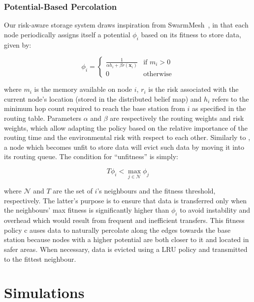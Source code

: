 \subsubsection{Potential-Based Percolation}
Our risk-aware storage system draws inspiration from 
SwarmMesh~\cite{majcherczykSwarmmesh2020}, in that each node periodically assigns
itself a potential $\phi_i$ based on its fitness to store data, given by:

\begin{equation}
        \phi_i =
        \left\{ 
        \begin{array}{ll}
            \frac{1}{\alpha h_i + \beta r({\bm{x}_i})} &\text{if } m_i > 0 \\
            0 &\text{otherwise}
        \end{array} \right.
        \label{equation:fitness}
\end{equation}

 where $m_i$ is the memory available on node $i$, $r_i$ is the risk
 associated with the current node's location (stored in the
 distributed belief map) and $h_i$ refers to the minimum hop count
 required to reach the base station from $i$ as specified in the
 routing table. Parameters $\alpha$ and $\beta$ are respectively the routing weights and 
 risk weights, which allow adapting the policy based on the relative importance of the 
 routing time and the environmental risk with respect to each other. Similarly to 
 \cite{majcherczykSwarmmesh2020}, a node  which becomes unfit to store data will evict such 
 data by moving it into its routing queue. The condition for ``unfitness'' is simply:

\begin{equation}
    T\phi_i < \max_{j \in \mathcal{N}} \phi_j
\end{equation}

where $\mathcal{N}$ and $T$ are the set of $i$'s neighbours and the fitness threshold, 
respectively. The latter's purpose is to ensure that data is transferred only when the 
neighbours' max fitness is significantly higher than $\phi_i$ to avoid instability and 
overhead which would result from frequent and inefficient transfers. This fitness policy  c
auses data to naturally percolate along the edges towards the base station because nodes 
with a higher potential are both closer to it and
located in safer areas. When necessary, data is evicted using a \ac{LRU} policy and transmitted to the fittest neighbour.


\section{Simulations}
\label{Simulations}

